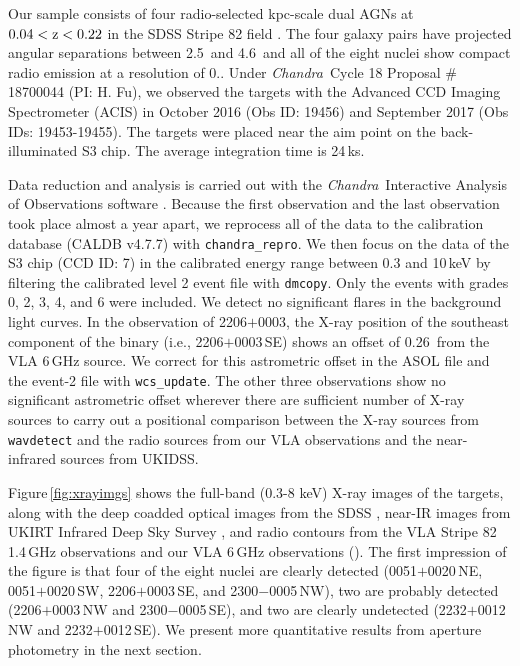 \documentclass[iop,revtex4,twocolumn,apj,numberedappendix,appendixfloats]{emulateapj}
\newcommand{\chandra}{{\it Chandra}}
\begin{document}
Our sample consists of four radio-selected kpc-scale dual AGNs at $0.04 < \rm z < 0.22$ in the SDSS Stripe 82 field  . The four galaxy pairs have projected angular separations between 2.5\arcsec\ and 4.6\arcsec\ and all of the eight nuclei show compact radio emission at a resolution of 0.. Under \chandra\ Cycle 18 Proposal \# 18700044 (PI: H. Fu), we observed the targets with the Advanced CCD Imaging Spectrometer (ACIS) in October 2016 (Obs ID: 19456) and September 2017 (Obs IDs: 19453-19455). The targets were placed near the aim point on the back-illuminated S3 chip. The average integration time is 24\,ks. 

Data reduction and analysis is carried out with the \chandra\ Interactive Analysis of Observations software \citep[CIAO v4.9;][]{Fruscione06}. Because the first observation and the last observation took place almost a year apart, we reprocess all of the data to the calibration database (CALDB v4.7.7) with \texttt{chandra\_repro}. We then focus on the data of the S3 chip (CCD ID: 7) in the calibrated energy range between 0.3 and 10\,keV by filtering the calibrated level 2 event file with \texttt{dmcopy}. Only the events with grades 0, 2, 3, 4, and 6 were included. We detect no significant flares in the background light curves. In the observation of 2206$+$0003, the X-ray position of the southeast component of the binary (i.e., 2206$+$0003\,SE) shows an offset of 0.26\arcsec\ from the VLA 6\,GHz source. We correct for this astrometric offset in the ASOL file and the event-2 file with \texttt{wcs\_update}. The other three observations show no significant astrometric offset wherever there are sufficient number of X-ray sources to carry out a positional comparison between the X-ray sources from \texttt{wavdetect} and the radio sources from our VLA observations and the near-infrared sources from UKIDSS. 

Figure\,\ref{fig:xrayimgs} shows the full-band (0.3-8 keV) X-ray images of the targets, along with the deep coadded optical images from the SDSS \citep{Jiang14}, near-IR images from UKIRT Infrared Deep Sky Survey \citep[UKIDSS;][]{Warren07}, and radio contours from the VLA Stripe 82 1.4\,GHz observations \citep[VS82;][]{Hodge11} and our VLA 6\,GHz observations (). The first impression of the figure is that four of the eight nuclei are clearly detected (0051$+$0020\,NE, 0051$+$0020\,SW, 2206$+$0003\,SE, and 2300$-$0005\,NW), two are probably detected (2206$+$0003\,NW and 2300$-$0005\,SE), and two are clearly undetected (2232$+$0012\,NW and 2232$+$0012\,SE). We present more quantitative results from aperture photometry in the next section.
\end{document}
